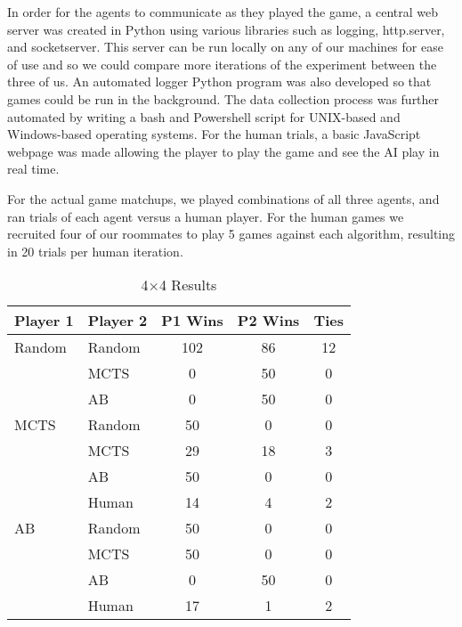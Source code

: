 \documentclass[12pt]{article}
\begin{document}
    In order for the agents to communicate as they played the game, a central web server was created in Python using various libraries such as logging, http.server, and socketserver. This server can be run locally on any of our machines for ease of use and so we could compare more iterations of the experiment between the three of us. An automated logger Python program was also developed so that games could be run in the background. The data collection process was further automated by writing a bash and Powershell script for UNIX-based and Windows-based operating systems. For the human trials, a basic JavaScript webpage was made allowing the player to play the game and see the AI play in real time. 

    For the actual game matchups, we played combinations of all three agents, and ran trials of each agent versus a human player. For the human games we recruited four of our roommates to play 5 games against each algorithm, resulting in 20 trials per human iteration. 
    
    
    \clearpage
    \begin{table}[htb]
        \begin{center}
            \caption{4\(\times\)4 Results}
            \begin{tabular}{llccc}
                \toprule
                Player 1 & Player 2 & P1 Wins & P2 Wins & Ties \\
                \toprule
                Random & Random & 102 & 86 & 12\\
                 & MCTS & 0 & 50 & 0\\
                 & AB & 0 & 50 & 0\\
                \midrule
                MCTS & Random & 50 & 0 & 0\\
                 & MCTS & 29 & 18 & 3\\
                 & AB & 50 & 0 & 0 \\
                 & Human & 14 & 4 & 2\\
                \midrule
                AB & Random & 50 & 0 & 0\\
                 & MCTS & 50 & 0 & 0\\
                 & AB & 0 & 50 & 0\\
                 & Human & 17 & 1 & 2\\
                \bottomrule
            \end{tabular}
        \end{center}
    \end{table}
    
\end{document}
